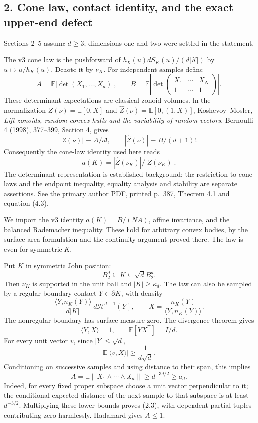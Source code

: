 \documentclass[
  11pt,
]{article}
\begin{document}
\subsection{2. Cone law, contact identity, and the exact upper-end
defect}\label{cone-law-contact-identity-and-the-exact-upper-end-defect}

Sections 2--5 assume \(d\ge3\); dimensions one and two were settled in
the statement.

The v3 cone law is the pushforward of \(h_K(u)dS_K(u)/(d|K|)\) by
\(u\mapsto u/h_K(u)\). Denote it by \(\nu_K\). For independent samples
define \[
 A=\mathbb E|\det(X_1,\ldots,X_d)|,
 \qquad
 B=\mathbb E\left|\det\begin{pmatrix}X_1&\cdots&X_N\\1&\cdots&1\end{pmatrix}\right|.
\] These determinant expectations are classical zonoid volumes. In the
normalization \(Z(\nu)=\mathbb E[0,X]\) and
\(\widehat Z(\nu)=\mathbb E[0,(1,X)]\), Koshevoy--Mosler, \emph{Lift
zonoids, random convex hulls and the variability of random vectors},
Bernoulli 4 (1998), 377--399, Section 4, gives \[
 |Z(\nu)|=A/d!,\qquad |\widehat Z(\nu)|=B/(d+1)!.
\] Consequently the cone-law identity used here reads \[
 a(K)=|\widehat Z(\nu_K)|/|Z(\nu_K)|.
\] The determinant representation is established background; the
restriction to cone laws and the endpoint inequality, equality analysis
and stability are separate assertions. See the
\href{https://wisostat.uni-koeln.de/sites/dep_econometrics/pdf_publikationen/1998_KoshevoyM98.pdf}{primary
author PDF}, printed p.~387, Theorem 4.1 and equation (4.3).

We import the v3 identity \(a(K)=B/(NA)\), affine invariance, and the
balanced Rademacher inequality. These hold for arbitrary convex bodies,
by the surface-area formulation and the continuity argument proved
there. The law is even for symmetric \(K\).

Put \(K\) in symmetric John position: \[
 B_2^d\subseteq K\subseteq\sqrt d B_2^d.                          \tag{2.1}
\] Then \(\nu_K\) is supported in the unit ball and \(|K|\ge\kappa_d\).
The law can also be sampled by a regular boundary contact
\(Y\in\partial K\), with density \[
 \frac{\langle Y,n_K(Y)\rangle}{d|K|}\,d\mathcal H^{d-1}(Y),
 \qquad X=\frac{n_K(Y)}{\langle Y,n_K(Y)\rangle}.
\] The nonregular boundary has surface measure zero. The divergence
theorem gives \[
 \langle Y,X\rangle=1,
 \qquad \mathbb E[Y X^{\mathsf T}]=I/d.                          \tag{2.2}
\] For every unit vector \(v\), since \(|Y|\le\sqrt d\), \[
 \mathbb E|\langle v,X\rangle|\ge\frac1{d\sqrt d}.
\] Conditioning on successive samples and using distance to their span,
this implies \[
 A=\mathbb E\|X_1\wedge\cdots\wedge X_d\|
 \ge d^{-3d/2}\ge a_d.                                         \tag{2.3}
\] Indeed, for every fixed proper subspace choose a unit vector
perpendicular to it; the conditional expected distance of the next
sample to that subspace is at least \(d^{-3/2}\). Multiplying these
lower bounds proves (2.3), with dependent partial tuples contributing
zero harmlessly. Hadamard gives \(A\le1\).
\end{document}
